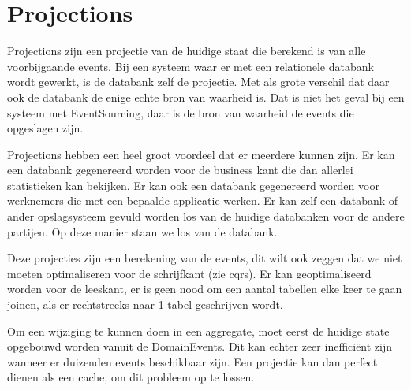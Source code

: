 
\section{Projections}
\label{sec:projections}

Projections zijn een projectie van de huidige staat die berekend is van alle voorbijgaande events. Bij een systeem waar er met een relationele databank wordt gewerkt, is de databank zelf de projectie. Met als grote verschil dat daar ook de databank de enige echte bron van waarheid is. Dat is niet het geval bij een systeem met EventSourcing, daar is de bron van waarheid de events die opgeslagen zijn.

Projections hebben een heel groot voordeel dat er meerdere kunnen zijn. Er kan een databank gegenereerd worden voor de business kant die dan allerlei statistieken kan bekijken. Er kan ook een databank gegenereerd worden voor werknemers die met een bepaalde applicatie werken. Er kan zelf een databank of ander opslagsysteem gevuld worden los van de huidige databanken voor de andere partijen. Op deze manier staan we los van de databank.

Deze projecties zijn een berekening van de events, dit wilt ook zeggen dat we niet moeten optimaliseren voor de schrijfkant (zie cqrs). Er kan geoptimaliseerd worden voor de leeskant, er is geen nood om een aantal tabellen elke keer te gaan joinen, als er rechtstreeks naar 1 tabel geschrijven wordt.

Om een wijziging te kunnen doen in een aggregate, moet eerst de huidige state opgebouwd worden vanuit de DomainEvents. Dit kan echter zeer inefficiënt zijn wanneer er duizenden events beschikbaar zijn. Een projectie kan dan perfect dienen als een cache, om dit probleem op te lossen.